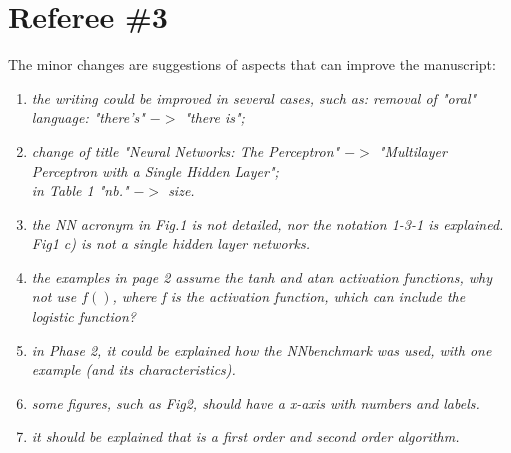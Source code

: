 \documentclass[12pt]{article}
\begin{document}
\newpage
\section{Referee \#3}\label{referee3}

The minor changes are suggestions of aspects that can improve the manuscript:
\begin{enumerate}
\item \textit{the writing could be improved in several cases, such as: removal of "oral" language: "there’s" $->$ "there is";}

\item \textit{change of title "Neural Networks: The Perceptron" $->$ "Multilayer Perceptron with a Single Hidden Layer";\\
 in Table 1 "nb." $->$ size.}

\item \textit{the NN acronym in Fig.1 is not detailed, nor the notation 1-3-1 is explained.\\ 
Fig1 c) is not a single hidden layer networks.}

\item \textit{the examples in page 2 assume the tanh and atan activation functions, why not use $f()$, where f is the activation function, which can include the logistic function?}

\item \textit{in Phase 2, it could be explained how the NNbenchmark was used, with one example (and its characteristics).}

\item \textit{some figures, such as Fig2, should have a x-axis with numbers and labels.}

\item \textit{it should be explained that is a first order and second order algorithm.}
\end{enumerate}
\end{document}
